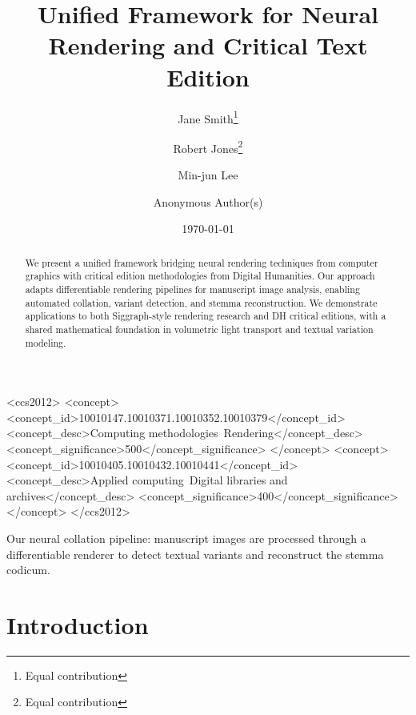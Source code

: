 \documentclass[12pt,a4paper]{article}
\title{Unified Framework for Neural Rendering and Critical Text Edition}
\author{Jane Smith\thanks{Equal contribution} \and Robert Jones\thanks{Equal contribution} \and Min-jun Lee}
\affiliation{%
    \institution{Institute for Digital Humanities}
    \city{Berlin}
    \country{Germany}
}
\affiliation{%
    \institution{Computer Graphics Lab}
    \city{Tokyo}
    \country{Japan}
}
\date{\today}
\author{Anonymous Author(s)}
\affiliation{\institution{Anonymous Institution}}
\begin{document}
\maketitle

\begin{abstract}
We present a unified framework bridging neural rendering techniques
from computer graphics with critical edition methodologies from
Digital Humanities. Our approach adapts differentiable rendering
pipelines for manuscript image analysis, enabling automated
collation, variant detection, and stemma reconstruction. We
demonstrate applications to both Siggraph-style rendering research
and DH critical editions, with a shared mathematical foundation
in volumetric light transport and textual variation modeling.
\end{abstract}

\ifdhformat
\tableofcontents
\newpage
\fi

\ifdhformat
\else
\begin{CCSXML}
<ccs2012>
<concept>
<concept_id>10010147.10010371.10010352.10010379</concept_id>
<concept_desc>Computing methodologies~Rendering</concept_desc>
<concept_significance>500</concept_significance>
</concept>
<concept>
<concept_id>10010405.10010432.10010441</concept_id>
<concept_desc>Applied computing~Digital libraries and archives</concept_desc>
<concept_significance>400</concept_significance>
</concept>
</ccs2012>
\end{CCSXML}



\begin{teaserfigure}
\centering
{}
\caption{Our neural collation pipeline: manuscript images are processed through a differentiable renderer to detect textual variants and reconstruct the stemma codicum.}\label{fig:teaser}
\end{teaserfigure}
\fi

\section{Introduction}
\label{sec:intro}
\end{document}

